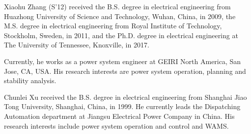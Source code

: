 \documentclass[journal]{IEEEtran}
\begin{document}


%
%
%




% 

\begin{IEEEbiographynophoto}{Xiaohu Zhang}
	(S'12) received the B.S. degree in electrical engineering from Huazhong University of Science and Technology, Wuhan, China, in 2009, the M.S. degree in electrical engineering from Royal Institute of Technology, Stockholm, Sweden, in 2011, and the Ph.D. degree in electrical engineering at The University of Tennessee, Knoxville, in 2017. 
	
	Currently, he works as a power system engineer at GEIRI North America, San Jose, CA, USA. His research interests are power system operation, planning and stability analysis.
\end{IEEEbiographynophoto}

\begin{IEEEbiographynophoto}{Chunlei Xu}
	received the B.S. degree in electrical
	engineering from Shanghai Jiao Tong University,
	Shanghai, China, in 1999. He currently leads the
	Dispatching Automation department at Jiangsu
	Electrical Power Company in China. His research
	interests include power system operation and control
	and WAMS.
\end{IEEEbiographynophoto}
\end{document}
